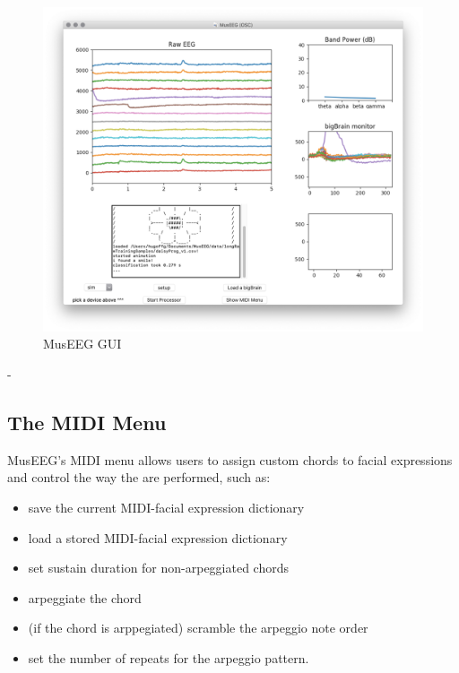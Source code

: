 \pagebreak


   \begin{figure}[htbp]
	\centering
		\includegraphics[width=1\columnwidth]{museeg-gui-v2.png}
	\caption{MusEEG GUI}
	\label{fig:museeg-gui}
\end{figure} 

-
\pagebreak


\subsection{The MIDI Menu}
MusEEG's MIDI menu allows users to assign custom chords to facial expressions and control the way the are performed, such as:
\begin{itemize}
\item save the current MIDI-facial expression dictionary
\item load a stored MIDI-facial expression dictionary
\item set sustain duration for non-arpeggiated chords
\item arpeggiate the chord
\item (if the chord is arppegiated) scramble the arpeggio note order
\item set the number of repeats for the arpeggio pattern. 
\end{itemize}


